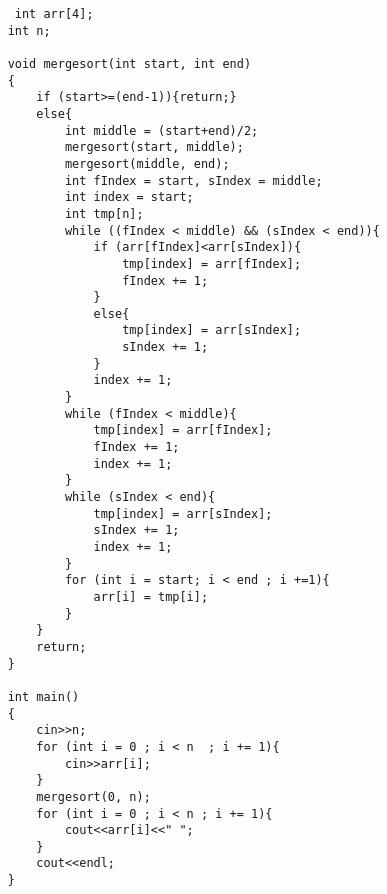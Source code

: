 \documentclass[12pt]{article}
\begin{document}
\begin{verbatim}
     int arr[4];
    int n;
    
    void mergesort(int start, int end)
    {
        if (start>=(end-1)){return;}
        else{
            int middle = (start+end)/2;
            mergesort(start, middle);
            mergesort(middle, end);
            int fIndex = start, sIndex = middle;
            int index = start;
            int tmp[n];
            while ((fIndex < middle) && (sIndex < end)){
                if (arr[fIndex]<arr[sIndex]){
                    tmp[index] = arr[fIndex];
                    fIndex += 1;
                }
                else{
                    tmp[index] = arr[sIndex];
                    sIndex += 1;
                }
                index += 1;
            }
            while (fIndex < middle){
                tmp[index] = arr[fIndex];
                fIndex += 1;
                index += 1;
            }
            while (sIndex < end){
                tmp[index] = arr[sIndex];
                sIndex += 1;
                index += 1;
            }
            for (int i = start; i < end ; i +=1){
                arr[i] = tmp[i];
            }
        }
        return;
    }
    
    int main()
    {
        cin>>n;
        for (int i = 0 ; i < n  ; i += 1){
            cin>>arr[i];
        }
        mergesort(0, n);
        for (int i = 0 ; i < n ; i += 1){
            cout<<arr[i]<<" ";
        }
        cout<<endl;
    }
\end{verbatim}
\end{document}
